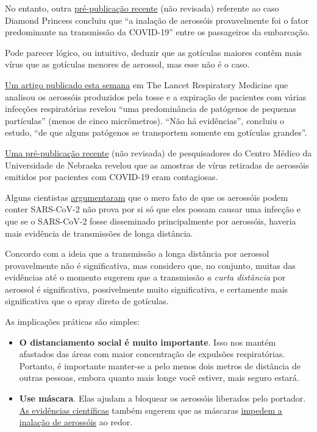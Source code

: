 No entanto, outra
\href{https://www.medrxiv.org/content/10.1101/2020.07.13.20153049v1}{pré-publicação
recente} (não revisada) referente ao caso Diamond Princess concluiu que
``a inalação de aerossóis provavelmente foi o fator predominante na
transmissão da COVID-19'' entre os passageiros da embarcação.

Pode parecer lógico, ou intuitivo, deduzir que as gotículas maiores
contêm mais vírus que as gotículas menores de aerossol, mas esse não é o
caso.

\href{https://www.thelancet.com/journals/lanres/article/PIIS2213-2600(20)30323-4/fulltext}{Um
artigo publicado esta semana} em The Lancet Respiratory Medicine que
analisou os aerossóis produzidos pela tosse e a expiração de pacientes
com várias infecções respiratórias revelou ``uma predominância de
patógenos de pequenas partículas'' (menos de cinco micrômetros). ``Não
há evidências'', concluiu o estudo, ``de que alguns patógenos se
transportem somente em gotículas grandes''.

\href{https://www.medrxiv.org/content/10.1101/2020.07.13.20041632v2}{Uma
pré-publicação recente} (não revisada) de pesquisadores do Centro Médico
da Universidade de Nebraska revelou que as amostras de vírus retiradas
de aerossóis emitidos por pacientes com COVID-19 eram contagiosas.

Alguns cientistas
\href{https://jamanetwork.com/journals/jama/fullarticle/2768396}{argumentaram}
que o mero fato de que os aerossóis podem conter SARS-CoV-2 não prova
por si só que eles possam causar uma infecção e que se o SARS-CoV-2
fosse disseminado principalmente por aerossóis, haveria mais evidência
de transmissões de longa distância.

Concordo com a ideia que a transmissão a longa distância por aerossol
provavelmente não é significativa, mas considero que, no conjunto,
muitas das evidências até o momento sugerem que a transmissão \emph{a
curta distância} por aerossol é significativa, possivelmente muito
significativa, e certamente mais significativa que o spray direto de
gotículas.

As implicações práticas são simples:

\begin{itemize}
\item
  \textbf{O distanciamento social é muito importante}. Isso nos mantém
  afastados das áreas com maior concentração de expulsões respiratórias.
  Portanto, é importante manter-se a pelo menos dois metros de distância
  de outras pessoas, embora quanto mais longe você estiver, mais seguro
  estará.
\item
  \textbf{Use máscara}. Elas ajudam a bloquear os aerossóis liberados
  pelo portador.
  \href{https://ucsf.app.box.com/s/blvolkp5z0mydzd82rjks4wyleagt036}{As
  evidências científicas} também sugerem que as máscaras
  \href{https://www.nytimes.com/2020/07/27/health/coronavirus-mask-protection.html?campaign_id=154\&emc=edit_cb_20200727\&instance_id=20696\&nl=coronavirus-briefing\&regi_id=65413713\&segment_id=34503\&te=1\&user_id=bd32fbf008e5183a7928ed61c60669f7}{impedem
  a inalação de aerossóis} ao redor.
\end{itemize}

